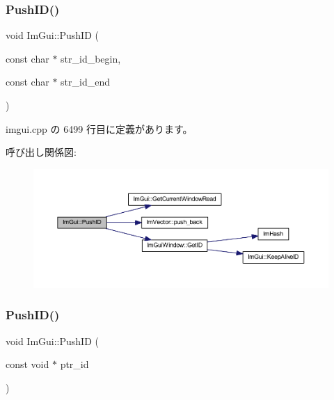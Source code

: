 \mbox{\label{namespace_im_gui_af5e55788830807a7c53d5dd7865b692a}} 
\subsubsection{\texorpdfstring{Push\+I\+D()}{PushID()}\hspace{0.1cm}{\footnotesize\ttfamily [2/4]}}
{\footnotesize\ttfamily void Im\+Gui\+::\+Push\+ID (\begin{DoxyParamCaption}\item[{const char $\ast$}]{str\+\_\+id\+\_\+begin,  }\item[{const char $\ast$}]{str\+\_\+id\+\_\+end }\end{DoxyParamCaption})}



 imgui.\+cpp の 6499 行目に定義があります。

呼び出し関係図\+:\nopagebreak
\begin{figure}[H]
\begin{center}
\leavevmode
\includegraphics[width=350pt]{namespace_im_gui_af5e55788830807a7c53d5dd7865b692a_cgraph}
\end{center}
\end{figure}
\mbox{\label{namespace_im_gui_af9cf42fdf2fbc5eeec7521de14996bfb}} 
\subsubsection{\texorpdfstring{Push\+I\+D()}{PushID()}\hspace{0.1cm}{\footnotesize\ttfamily [3/4]}}
{\footnotesize\ttfamily void Im\+Gui\+::\+Push\+ID (\begin{DoxyParamCaption}\item[{const void $\ast$}]{ptr\+\_\+id }\end{DoxyParamCaption})}



